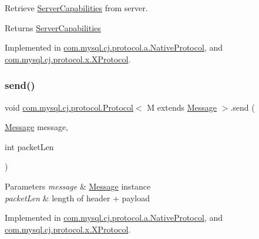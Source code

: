 Retrieve \mbox{\hyperlink{interfacecom_1_1mysql_1_1cj_1_1protocol_1_1_server_capabilities}{Server\+Capabilities}} from server.

\begin{DoxyReturn}{Returns}
\mbox{\hyperlink{interfacecom_1_1mysql_1_1cj_1_1protocol_1_1_server_capabilities}{Server\+Capabilities}} 
\end{DoxyReturn}


Implemented in \mbox{\hyperlink{classcom_1_1mysql_1_1cj_1_1protocol_1_1a_1_1_native_protocol_acfce17a81631146efc0ca8d9cef22880}{com.\+mysql.\+cj.\+protocol.\+a.\+Native\+Protocol}}, and \mbox{\hyperlink{classcom_1_1mysql_1_1cj_1_1protocol_1_1x_1_1_x_protocol_ade4f8f02c047acca33185b6460027ddb}{com.\+mysql.\+cj.\+protocol.\+x.\+X\+Protocol}}.

\mbox{\label{interfacecom_1_1mysql_1_1cj_1_1protocol_1_1_protocol_ae917ec7bc23dc3244bea8e745318c725}} 
\subsubsection{\texorpdfstring{send()}{send()}}
{\footnotesize\ttfamily void \mbox{\hyperlink{interfacecom_1_1mysql_1_1cj_1_1protocol_1_1_protocol}{com.\+mysql.\+cj.\+protocol.\+Protocol}}$<$ M extends \mbox{\hyperlink{interfacecom_1_1mysql_1_1cj_1_1protocol_1_1_message}{Message}} $>$.send (\begin{DoxyParamCaption}\item[{\mbox{\hyperlink{interfacecom_1_1mysql_1_1cj_1_1protocol_1_1_message}{Message}}}]{message,  }\item[{int}]{packet\+Len }\end{DoxyParamCaption})}


\begin{DoxyParams}{Parameters}
{\em message} & \mbox{\hyperlink{interfacecom_1_1mysql_1_1cj_1_1protocol_1_1_message}{Message}} instance \\
\hline
{\em packet\+Len} & length of header + payload \\
\hline
\end{DoxyParams}


Implemented in \mbox{\hyperlink{classcom_1_1mysql_1_1cj_1_1protocol_1_1a_1_1_native_protocol_ab8fc56f3c8cbc5abba6cb7c485f534f1}{com.\+mysql.\+cj.\+protocol.\+a.\+Native\+Protocol}}, and \mbox{\hyperlink{classcom_1_1mysql_1_1cj_1_1protocol_1_1x_1_1_x_protocol_ac6e989e8d119f8c1efd0fda253199727}{com.\+mysql.\+cj.\+protocol.\+x.\+X\+Protocol}}.

